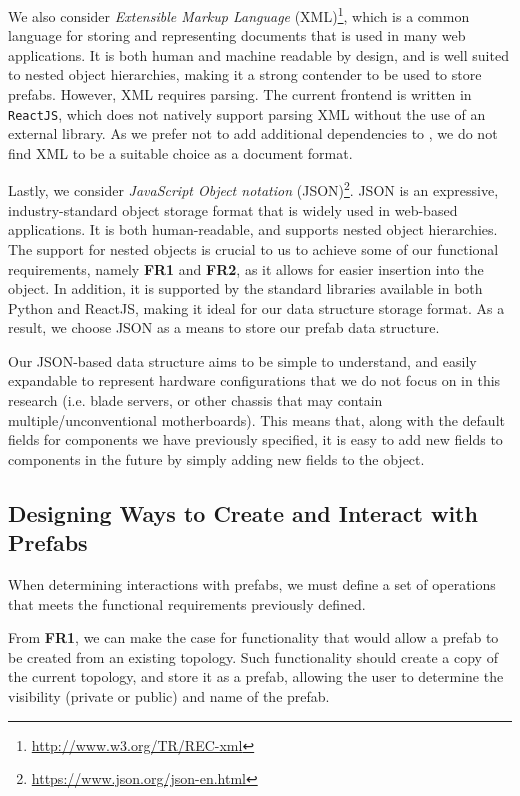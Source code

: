 \documentclass[11pt]{article}
\begin{document}
		We also consider \textit{Extensible Markup Language} (XML)\footnote{\url{http://www.w3.org/TR/REC-xml}}, which is a common language for storing and representing documents that is used in many web applications.
		It is both human and machine readable by design, and is well suited to nested object hierarchies, making it a strong contender to be used to store prefabs.
		However, XML requires parsing.
		The current \opendc{} frontend is written in \verb|ReactJS|, which does not natively support parsing XML without the use of an external library.
		As we prefer not to add additional dependencies to \opendc{}, we do not find XML to be a suitable choice as a document format.

		Lastly, we consider \textit{JavaScript Object notation} (JSON)\footnote{\url{https://www.json.org/json-en.html}}.
		JSON is an expressive, industry-standard object storage format that is widely used in web-based applications.
		It is both human-readable, and supports nested object hierarchies.
		The support for nested objects is crucial to us to achieve some of our functional requirements, namely \textbf{FR1} and \textbf{FR2}, as it allows for easier insertion into the object.
		In addition, it is supported by the standard libraries available in both Python and ReactJS, making it ideal for our data structure storage format.
		As a result, we choose JSON as a means to store our prefab data structure.
		
		Our JSON-based data structure aims to be simple to understand, and easily expandable to represent hardware configurations that we do not focus on in this research (i.e. blade servers, or other chassis that may contain multiple/unconventional motherboards).
		This means that, along with the default fields for components we have previously specified, it is easy to add new fields to components in the future by simply adding new fields to the object.


	\subsection{Designing Ways to Create and Interact with Prefabs}
		When determining interactions with prefabs, we must define a set of operations that meets the functional requirements previously defined.
		
		From \textbf{FR1}, we can make the case for functionality that would allow a prefab to be created from an existing topology.
		Such functionality should create a copy of the current topology, and store it as a prefab, allowing the user to determine the visibility (private or public) and name of the prefab.
\end{document}
